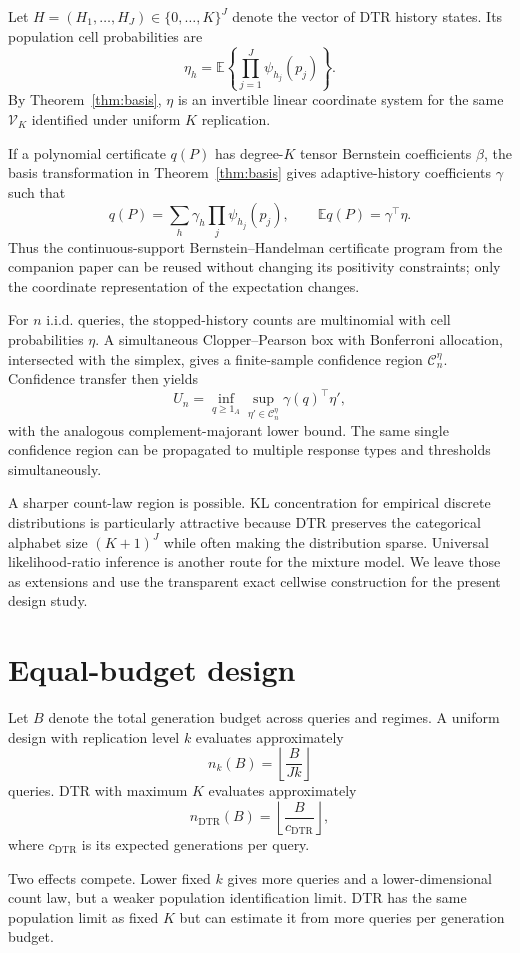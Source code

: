 \documentclass[11pt]{article}
\theoremstyle{remark}
\newcommand{\E}{\mathbb{E}}
\newcommand{\calV}{\mathcal{V}}
\newcommand{\calC}{\mathcal{C}}
\newcommand{\dtr}{\mathrm{DTR}}
\begin{document}
Let $H=(H_1,\ldots,H_J)\in\{0,\ldots,K\}^J$ denote the vector of DTR history states. Its population cell probabilities are
\[
 \eta_h=\E\left\{\prod_{j=1}^J\psi_{h_j}(p_j)\right\}.
\]
By Theorem~\ref{thm:basis}, $\eta$ is an invertible linear coordinate system for the same $\calV_K$ identified under uniform $K$ replication.

If a polynomial certificate $q(P)$ has degree-$K$ tensor Bernstein coefficients $\beta$, the basis transformation in Theorem~\ref{thm:basis} gives adaptive-history coefficients $\gamma$ such that
\[
 q(P)=\sum_h\gamma_h\prod_j\psi_{h_j}(p_j),
 \qquad
 \E q(P)=\gamma^\top\eta.
\]
Thus the continuous-support Bernstein--Handelman certificate program from the companion paper can be reused without changing its positivity constraints; only the coordinate representation of the expectation changes.

For $n$ i.i.d. queries, the stopped-history counts are multinomial with cell probabilities $\eta$. A simultaneous Clopper--Pearson box with Bonferroni allocation, intersected with the simplex, gives a finite-sample confidence region $\calC_n^\eta$. Confidence transfer then yields
\[
 U_n=\inf_{q\ge1_A}\sup_{\eta'\in\calC_n^\eta}\gamma(q)^\top\eta',
\]
with the analogous complement-majorant lower bound. The same single confidence region can be propagated to multiple response types and thresholds simultaneously.

A sharper count-law region is possible. KL concentration for empirical discrete distributions \citep{Mardia2020} is particularly attractive because DTR preserves the categorical alphabet size $(K+1)^J$ while often making the distribution sparse. Universal likelihood-ratio inference \citep{Wasserman2020} is another route for the mixture model. We leave those as extensions and use the transparent exact cellwise construction for the present design study.

\section{Equal-budget design}

Let $B$ denote the total generation budget across queries and regimes. A uniform design with replication level $k$ evaluates approximately
\[
 n_k(B)=\left\lfloor\frac{B}{Jk}\right\rfloor
\]
queries. DTR with maximum $K$ evaluates approximately
\[
 n_{\dtr}(B)=\left\lfloor\frac{B}{c_{\dtr}}\right\rfloor,
\]
where $c_{\dtr}$ is its expected generations per query.

Two effects compete. Lower fixed $k$ gives more queries and a lower-dimensional count law, but a weaker population identification limit. DTR has the same population limit as fixed $K$ but can estimate it from more queries per generation budget.
\end{document}
